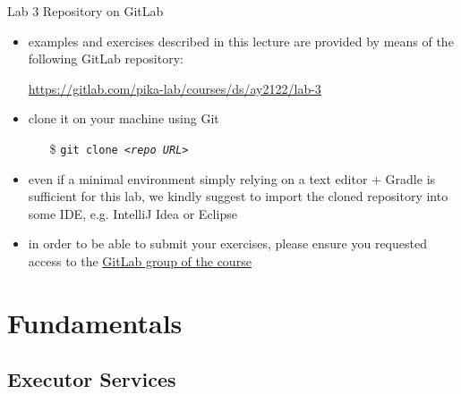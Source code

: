 \documentclass{beamer}\mode<presentation>{\usetheme{AMSBolognaFC}}
\newcommand{\labN}{3}
\newcommand{\labGroup}{https://gitlab.com/pika-lab/courses/ds/ay2122}
\newcommand{\labRepo}{\labGroup/lab-\labN}
\begin{document}
\begin{frame}[c]{Lab \labN{} Repository on GitLab}

	\begin{itemize}
		\item examples and exercises described in this lecture are provided by means of the following GitLab repository:
		\begin{center}
			\url{\labRepo}
		\end{center}

		\vfill

		\item clone it on your machine using Git
		\begin{itemize}
		    \item[\$] \texttt{git clone \textit{<repo URL>}}
		\end{itemize}

		\vfill

		\item even if a minimal environment simply relying on a text editor + Gradle is sufficient for this lab, we kindly suggest to import the cloned repository into some IDE, e.g. IntelliJ Idea or Eclipse

		\vfill

		\item in order to be able to submit your exercises, please ensure you requested access to the \href{\labGroup}{GitLab group of the course}
	\end{itemize}

\end{frame}

\section{Fundamentals}

\subsection{Executor Services}
\end{document}
